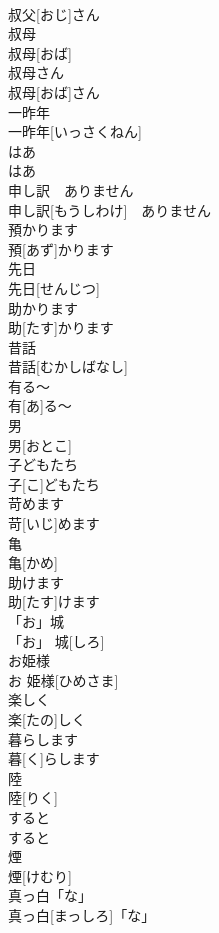 \documentclass[8pt]{extreport}
\begin{document}
\begin{CJK}{UTF8}{min}
\\	叔父[おじ]さん	
\\	叔母	
\\	叔母[おば]	
\\	叔母さん	
\\	叔母[おば]さん	
\\	一昨年	
\\	一昨年[いっさくねん]	
\\	はあ	
\\	はあ	
\\	申し訳　ありません	
\\	申し訳[もうしわけ]　ありません	
\\	預かります	
\\	預[あず]かります	
\\	先日	
\\	先日[せんじつ]	
\\	助かります	
\\	助[たす]かります	
\\	昔話	
\\	昔話[むかしばなし]	
\\	有る〜	
\\	有[あ]る〜	
\\	男	
\\	男[おとこ]	
\\	子どもたち	
\\	子[こ]どもたち	
\\	苛めます	
\\	苛[いじ]めます	
\\	亀	
\\	亀[かめ]	
\\	助けます	
\\	助[たす]けます	
\\	「お」城	
\\	「お」 城[しろ]	
\\	お姫様	
\\	お 姫様[ひめさま]	
\\	楽しく	
\\	楽[たの]しく	
\\	暮らします	
\\	暮[く]らします	
\\	陸	
\\	陸[りく]	
\\	すると	
\\	すると	
\\	煙	
\\	煙[けむり]	
\\	真っ白「な」	
\\	真っ白[まっしろ]「な」	

\end{CJK}
\end{document}
